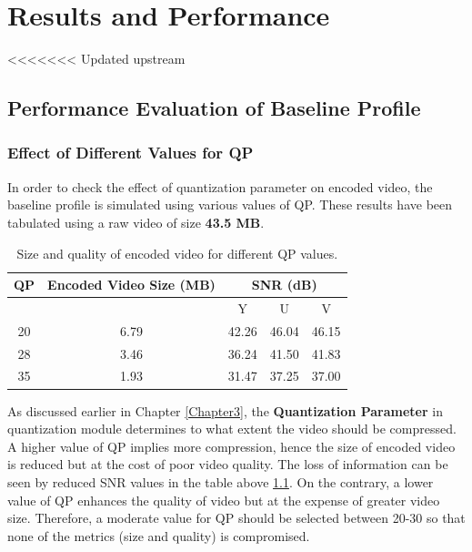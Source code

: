 
\chapter{Results and Performance} %
\label{Chapter5}
<<<<<<< Updated upstream


\section{Performance Evaluation of Baseline Profile}

\subsection{Effect of Different Values for QP}
In order to check the effect of quantization parameter on encoded video, the baseline profile is simulated using various values of QP. These results have been tabulated using a raw video of size \textbf{43.5 MB}.
\begin{table}[H]
\centering
\begin{tabular}{|c|c|c|c|c|} \hline
QP  & Encoded Video Size (MB) & \multicolumn{3}{|c|}{SNR (dB)}  \\ \hline
    &                    &  Y & U & V \\ \hline
20  &    6.79            & 42.26   & 46.04  & 46.15  \\ \hline
28  &    3.46            & 36.24   & 41.50  & 41.83  \\ \hline
35  &    1.93            & 31.47   & 37.25  & 37.00  \\ \hline
\end{tabular}
\caption{Size and quality of encoded video for different QP values.}
\label{tab:qp}
\end{table}
As discussed earlier in Chapter \ref{Chapter3}, the \textbf{Quantization Parameter} in quantization module determines to what extent the video should be compressed. A higher value of QP implies more compression, hence the size of encoded video is reduced but at the cost of poor video quality. The loss of information can be seen by reduced SNR values in the table above \ref{tab:qp}. On the contrary, a lower value of QP enhances the quality of video but at the expense of greater video size. Therefore, a moderate value for QP should be selected between 20-30 so that none of the metrics (size and quality) is compromised. 

